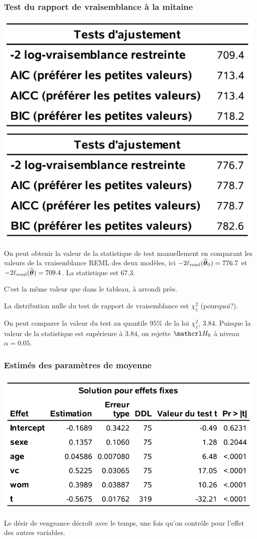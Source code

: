 \documentclass{beamer}
\begin{document}
\begin{frame}[fragile]
\frametitle{Test du rapport de vraisemblance à la mitaine}
\begin{center}
\includegraphics[width = 0.35\linewidth]{img/c5/diapos6-e10}
\includegraphics[width = 0.35\linewidth]{img/c5/diapos6-e11}
\end{center}
\bi 
\item On peut obtenir la valeur de la statistique de test manuellement en comparant les valeurs de la vraisemblance REML des deux modèles, ici $-2\ell_{\textrm{reml}}(\widehat{\boldsymbol {\theta}}_0)=776.7$ et $-2\ell_{\textrm{reml}}(\widehat{\boldsymbol {\theta}})=709.4$. La statistique est $67.3$. 
\bi
\item {\footnotesize C'est la même valeur que dans le tableau, à arrondi près. }
\ei 
\item La distribution nulle du test de rapport de vraisemblance est  $\chi^2_1$ (pourquoi?).
\item On peut comparer la valeur du test au quantile $95\%$ de la loi $\chi^2_1$, $3.84$. Puisque la valeur de la statistique est supérieure à $3.84$, on rejette $\Hy_0$ à niveau $\alpha=0.05$.
\ei
\end{frame}
\begin{frame}[fragile]
\frametitle{Estimés des paramètres de moyenne}
\begin{center}
\includegraphics[width = 0.7\linewidth]{img/c5/diapos6-e12}
\end{center}
Le désir de vengeance décroît avec le temps, une fois qu'on contrôle pour l'effet des autres variables.
\end{frame}
\end{document}
